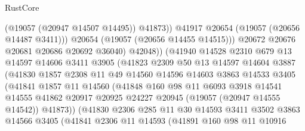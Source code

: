 \begin{lexlean}{RustCore}
\begin{coremodule}
                                (@19057 (@20947 @14507 @14495))
                                @41873))
                            @41917
                            @20654
                            (@19057 (@20656 @14487 @3411)))
                          @20654
                          (@19057 (@20656 @14455 @14515)))
                        @20672
                        @20676
                        @20681
                        @20686
                        @20692
                        @36040)
                      @42048))
                  (@41940
                    @14528
                    @2310
                    @679
                    @13
                    @14597
                    @14606
                    @3411
                    @3905
                    (@41823
                      @2309
                      @50
                      @13
                      @14597
                      @14604
                      @3887
                      (@41830
                        @1857
                        @2308
                        @11
                        @49
                        @14560
                        @14596
                        @14603
                        @3863
                        @14533
                        @3405
                        (@41841
                          @1857
                          @11
                          @14560
                          (@41848
                            @160
                            @98
                            @11
                            @6093
                            @3918
                            @14541
                            @14555
                            @41862
                            @20917
                            @20925
                            @24227
                            @20945
                            (@19057 (@20947 @14555 @14542))
                            @41873))
                        (@41830
                          @2306
                          @285
                          @11
                          @30
                          @14593
                          @3411
                          @3502
                          @3863
                          @14566
                          @3405
                          (@41841
                            @2306
                            @11
                            @14593
                            (@41891
                              @160
                              @98
                              @11
                              @10916

\end{coremodule}
\end{lexlean}
